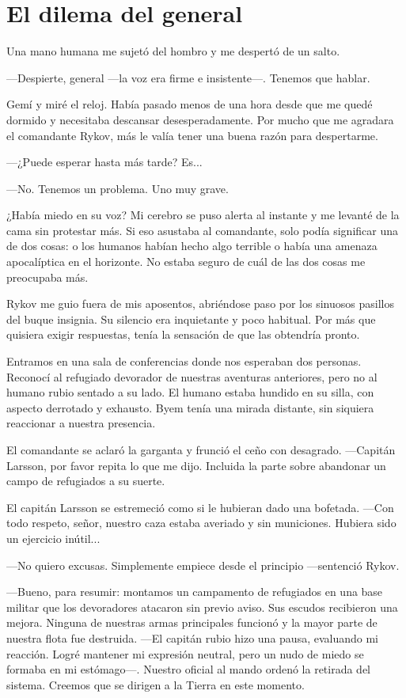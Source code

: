\chapter{El dilema del general}\label{sec:el-dilema-del-general}

Una mano humana me sujetó del hombro y me despertó de un salto.

—Despierte, general —la voz era firme e insistente—. Tenemos que hablar.

Gemí y miré el reloj. Había pasado menos de una hora desde que me quedé dormido y necesitaba descansar desesperadamente. Por mucho que me agradara el comandante Rykov, más le valía tener una buena razón para despertarme.

 —¿Puede esperar hasta más tarde? Es...

—No. Tenemos un problema. Uno muy grave.

¿Había miedo en su voz? Mi cerebro se puso alerta al instante y me levanté de la cama sin protestar más. Si eso asustaba al comandante, solo podía significar una de dos cosas: o los humanos habían hecho algo terrible o había una amenaza apocalíptica en el horizonte. No estaba seguro de cuál de las dos cosas me preocupaba más.

Rykov me guio fuera de mis aposentos, abriéndose paso por los sinuosos pasillos del buque insignia. Su silencio era inquietante y poco habitual. Por más que quisiera exigir respuestas, tenía la sensación de que las obtendría pronto.

Entramos en una sala de conferencias donde nos esperaban dos personas. Reconocí al refugiado devorador de nuestras aventuras anteriores, pero no al humano rubio sentado a su lado. El humano estaba hundido en su silla, con aspecto derrotado y exhausto. Byem tenía una mirada distante, sin siquiera reaccionar a nuestra presencia.

El comandante se aclaró la garganta y frunció el ceño con desagrado. —Capitán Larsson, por favor repita lo que me dijo. Incluida la parte sobre abandonar un campo de refugiados a su suerte.

El capitán Larsson se estremeció como si le hubieran dado una bofetada. —Con todo respeto, señor, nuestro caza estaba averiado y sin municiones. Hubiera sido un ejercicio inútil...

—No quiero excusas. Simplemente empiece desde el principio —sentenció Rykov.

—Bueno, para resumir: montamos un campamento de refugiados en una base militar que los devoradores atacaron sin previo aviso. Sus escudos recibieron una mejora. Ninguna de nuestras armas principales funcionó y la mayor parte de nuestra flota fue destruida. —El capitán rubio hizo una pausa, evaluando mi reacción. Logré mantener mi expresión neutral, pero un nudo de miedo se formaba en mi estómago—. Nuestro oficial al mando ordenó la retirada del sistema. Creemos que se dirigen a la Tierra en este momento.


